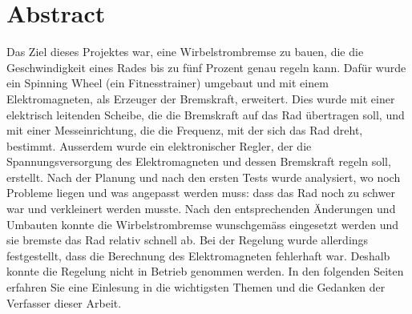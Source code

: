 \section{Abstract}\label{cap:abstract}
Das Ziel dieses Projektes war, eine Wirbelstrombremse zu bauen, die die Geschwindigkeit eines Rades bis zu fünf Prozent genau regeln kann. Dafür wurde ein Spinning Wheel (ein Fitnesstrainer) umgebaut und mit einem Elektromagneten, als Erzeuger der Bremskraft, erweitert. Dies wurde mit einer elektrisch leitenden Scheibe, die die Bremskraft auf das Rad übertragen soll, und mit einer Messeinrichtung, die die Frequenz, mit der sich das Rad dreht, bestimmt. Ausserdem wurde ein elektronischer Regler, der die Spannungsversorgung des Elektromagneten und dessen Bremskraft regeln soll, erstellt.
\newpara
Nach der Planung und nach den ersten Tests wurde analysiert, wo noch Probleme liegen und was angepasst werden muss: dass das Rad noch zu schwer war und verkleinert werden musste.
\newpara
Nach den entsprechenden Änderungen und Umbauten konnte die Wirbelstrombremse wunschgemäss eingesetzt werden und sie bremste das Rad relativ schnell ab. 
\newpara
Bei der Regelung wurde allerdings festgestellt, dass die Berechnung des Elektromagneten fehlerhaft war. Deshalb konnte die Regelung nicht in Betrieb genommen werden.
\newpara
In den folgenden Seiten erfahren Sie eine Einlesung in die wichtigsten Themen und die Gedanken der Verfasser dieser Arbeit.